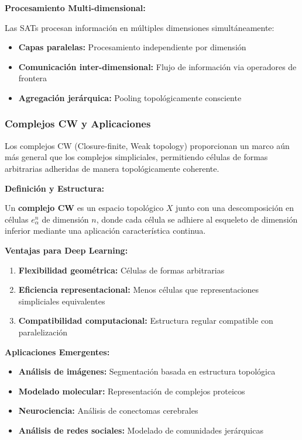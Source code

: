 \textbf{Procesamiento Multi-dimensional:}

Las SATs procesan información en múltiples dimensiones simultáneamente:
\begin{itemize}
    \item \textbf{Capas paralelas:} Procesamiento independiente por dimensión
    \item \textbf{Comunicación inter-dimensional:} Flujo de información via operadores de frontera
    \item \textbf{Agregación jerárquica:} Pooling topológicamente consciente
\end{itemize}

\subsubsection{Complejos CW y Aplicaciones}

Los complejos CW (Closure-finite, Weak topology) proporcionan un marco aún más general que los complejos simpliciales, permitiendo células de formas arbitrarias adheridas de manera topológicamente coherente.

\textbf{Definición y Estructura:}

\begin{definition}[Complejo CW]
Un \textbf{complejo CW} es un espacio topológico $X$ junto con una descomposición en células $e^n_\alpha$ de dimensión $n$, donde cada célula se adhiere al esqueleto de dimensión inferior mediante una aplicación característica continua.
\end{definition}

\textbf{Ventajas para Deep Learning:}
\begin{enumerate}
    \item \textbf{Flexibilidad geométrica:} Células de formas arbitrarias
    \item \textbf{Eficiencia representacional:} Menos células que representaciones simpliciales equivalentes
    \item \textbf{Compatibilidad computacional:} Estructura regular compatible con paralelización
\end{enumerate}

\textbf{Aplicaciones Emergentes:}
\begin{itemize}
    \item \textbf{Análisis de imágenes:} Segmentación basada en estructura topológica
    \item \textbf{Modelado molecular:} Representación de complejos proteicos
    \item \textbf{Neurociencia:} Análisis de conectomas cerebrales
    \item \textbf{Análisis de redes sociales:} Modelado de comunidades jerárquicas
\end{itemize}

